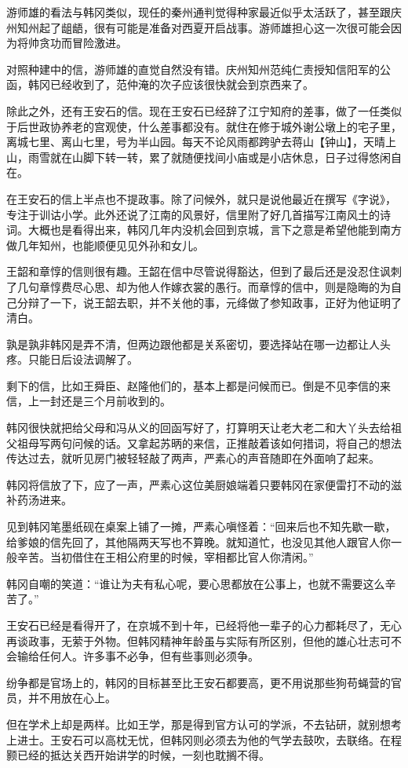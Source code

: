 游师雄的看法与韩冈类似，现任的秦州通判觉得种家最近似乎太活跃了，甚至跟庆州知州起了龃龉，很有可能是准备对西夏开启战事。游师雄担心这一次很可能会因为将帅贪功而冒险激进。

对照种建中的信，游师雄的直觉自然没有错。庆州知州范纯仁责授知信阳军的公函，韩冈已经收到了，范仲淹的次子应该很快就会到京西来了。

除此之外，还有王安石的信。现在王安石已经辞了江宁知府的差事，做了一任类似于后世政协养老的宫观使，什么差事都没有。就住在修于城外谢公墩上的宅子里，离城七里、离山七里，号为半山园。每天不论风雨都跨驴去蒋山【钟山】，天晴上山，雨雪就在山脚下转一转，累了就随便找间小庙或是小店休息，日子过得悠闲自在。

在王安石的信上半点也不提政事。除了问候外，就只是说他最近在撰写《字说》，专注于训诂小学。此外还说了江南的风景好，信里附了好几首描写江南风土的诗词。大概也是看得出来，韩冈几年内没机会回到京城，言下之意是希望他能到南方做几年知州，也能顺便见见外孙和女儿。

王韶和章惇的信则很有趣。王韶在信中尽管说得豁达，但到了最后还是没忍住讽刺了几句章惇费尽心思、却为他人作嫁衣裳的愚行。而章惇的信中，则是隐晦的为自己分辩了一下，说王韶去职，并不关他的事，元绛做了参知政事，正好为他证明了清白。

孰是孰非韩冈是弄不清，但两边跟他都是关系密切，要选择站在哪一边都让人头疼。只能日后设法调解了。

剩下的信，比如王舜臣、赵隆他们的，基本上都是问候而已。倒是不见李信的来信，上一封还是三个月前收到的。

韩冈很快就把给父母和冯从义的回函写好了，打算明天让老大老二和大丫头去给祖父祖母写两句问候的话。又拿起苏昞的来信，正推敲着该如何措词，将自己的想法传达过去，就听见房门被轻轻敲了两声，严素心的声音随即在外面响了起来。

韩冈将信放了下，应了一声，严素心这位美厨娘端着只要韩冈在家便雷打不动的滋补药汤进来。

见到韩冈笔墨纸砚在桌案上铺了一摊，严素心嗔怪着：“回来后也不知先歇一歇，给爹娘的信先回了，其他隔两天写也不算晚。就知道忙，也没见其他人跟官人你一般辛苦。当初借住在王相公府里的时候，宰相都比官人你清闲。”

韩冈自嘲的笑道：“谁让为夫有私心呢，要心思都放在公事上，也就不需要这么辛苦了。”

王安石已经是看得开了，在京城不到十年，已经将他一辈子的心力都耗尽了，无心再谈政事，无萦于外物。但韩冈精神年龄虽与实际有所区别，但他的雄心壮志可不会输给任何人。许多事不必争，但有些事则必须争。

纷争都是官场上的，韩冈的目标甚至比王安石都要高，更不用说那些狗苟蝇营的官员，并不用放在心上。

但在学术上却是两样。比如王学，那是得到官方认可的学派，不去钻研，就别想考上进士。王安石可以高枕无忧，但韩冈则必须去为他的气学去鼓吹，去联络。在程颢已经的抵达关西开始讲学的时候，一刻也耽搁不得。


